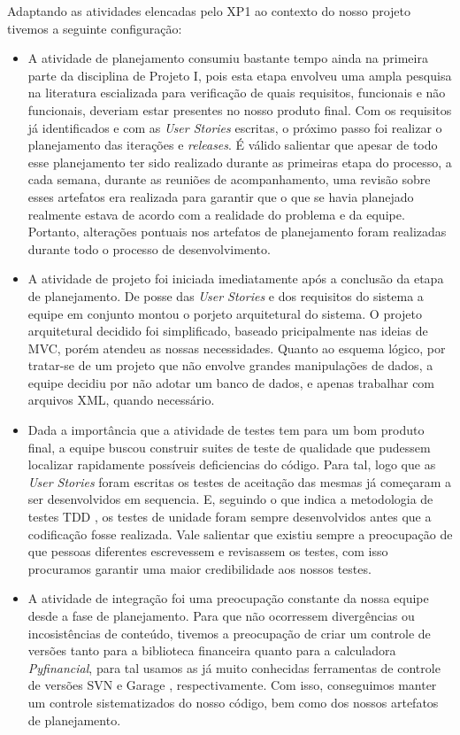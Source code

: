 Adaptando as atividades elencadas pelo XP1 ao contexto do nosso projeto tivemos a seguinte configuração: 
\begin{itemize}
 \item  A atividade de planejamento consumiu bastante tempo ainda na primeira parte da disciplina de Projeto I, pois esta etapa envolveu uma ampla pesquisa na literatura escializada para verificação de quais requisitos, funcionais e não funcionais, deveriam estar presentes no nosso produto final. Com os requisitos já identificados e com as \textit{User Stories} escritas, o próximo passo foi realizar o planejamento das iterações e \textit{releases}. É válido salientar que apesar de todo esse planejamento ter sido realizado durante as primeiras etapa do processo, a cada semana, durante as reuniões de acompanhamento, uma revisão sobre esses artefatos era realizada para garantir que o que se havia planejado realmente estava de acordo com a realidade do problema e da equipe. Portanto, alterações pontuais nos artefatos de planejamento foram realizadas durante todo o processo de desenvolvimento.
 \item A atividade de projeto foi iniciada imediatamente após a conclusão da etapa de planejamento. De posse das \textit{User Stories} e dos requisitos do sistema a equipe em conjunto montou o porjeto arquitetural do sistema. O projeto arquitetural decidido foi simplificado, baseado pricipalmente nas ideias de MVC, porém atendeu as nossas necessidades. Quanto ao esquema lógico, por tratar-se de um projeto que não envolve grandes manipulações de dados, a equipe decidiu por não adotar um banco de dados, e apenas trabalhar com arquivos XML, quando necessário.
 \item Dada a importância que a atividade de testes tem para um  bom produto final, a equipe buscou construir suites de teste de qualidade que pudessem localizar rapidamente possíveis deficiencias do código. Para tal, logo que as \textit{User Stories} foram escritas os testes de aceitação das mesmas já começaram a ser desenvolvidos em sequencia. E, seguindo o que indica a metodologia de testes TDD \cite{TDD}, os testes de unidade foram sempre desenvolvidos antes que a codificação fosse realizada. Vale salientar que existiu sempre a preocupação de que pessoas diferentes escrevessem e revisassem os testes, com isso procuramos garantir uma maior credibilidade aos nossos testes.
 \item A atividade de integração foi uma preocupação constante da nossa equipe desde a fase de planejamento. Para que não ocorressem divergências ou incosistências de conteúdo, tivemos a preocupação de criar um controle de versões tanto para a biblioteca financeira quanto para a calculadora \textit{Pyfinancial}, para tal usamos as já muito conhecidas ferramentas de controle de versões SVN \cite{SVN} e Garage \cite{garage}, respectivamente. Com isso, conseguimos manter um controle sistematizados do nosso código, bem como dos nossos artefatos de planejamento.

\end{itemize}
